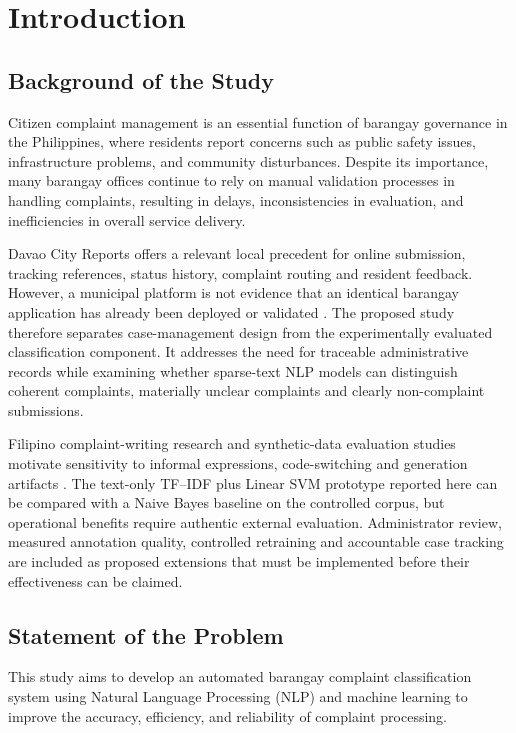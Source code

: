 \chapter{Introduction}

\section{Background of the Study}
Citizen complaint management is an essential function of barangay governance in the Philippines, where residents report concerns such as public safety issues, infrastructure problems, and community disturbances. Despite its importance, many barangay offices continue to rely on manual validation processes in handling complaints, resulting in delays, inconsistencies in evaluation, and inefficiencies in overall service delivery.

Davao City Reports offers a relevant local precedent for online submission, tracking references, status history, complaint routing and resident feedback. However, a municipal platform is not evidence that an identical barangay application has already been deployed or validated \cite{dcr}. The proposed study therefore separates case-management design from the experimentally evaluated classification component. It addresses the need for traceable administrative records while examining whether sparse-text NLP models can distinguish coherent complaints, materially unclear complaints and clearly non-complaint submissions.

Filipino complaint-writing research and synthetic-data evaluation studies motivate sensitivity to informal expressions, code-switching and generation artifacts \cite{deleon,li2023,benderfriedman}. The text-only TF--IDF plus Linear SVM prototype reported here can be compared with a Naive Bayes baseline on the controlled corpus, but operational benefits require authentic external evaluation. Administrator review, measured annotation quality, controlled retraining and accountable case tracking are included as proposed extensions that must be implemented before their effectiveness can be claimed.

\section{Statement of the Problem}
This study aims to develop an automated barangay complaint classification system using Natural Language Processing (NLP) and machine learning to improve the accuracy, efficiency, and reliability of complaint processing.

